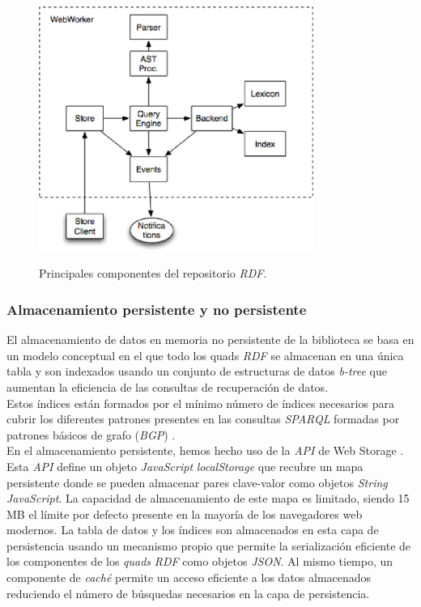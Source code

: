 \begin{figure}
\vspace{2.4in}
\centering
\caption{Principales componentes del repositorio \textit{RDF}.}
\vspace{5mm}
\includegraphics[width=0.8\textwidth]{figura4}
\label{figura4}
\end{figure}


\subsubsection{Almacenamiento persistente y no persistente}

El almacenamiento de datos en memoria no persistente de la biblioteca se basa en un modelo conceptual en el que todo los quads \textit{RDF} se almacenan en una \'unica tabla y son indexados usando un conjunto de estructuras de datos \textit{b-tree} que aumentan la eficiencia de las consultas de recuperaci\'on de datos.\\
Estos \'indices est\'an formados por el m\'inimo n\'umero de \'indices necesarios para cubrir los diferentes patrones presentes en las consultas \textit{SPARQL} formadas por patrones b\'asicos de grafo (\textit{BGP}) \cite{yars}.\\
En el almacenamiento persistente, hemos hecho uso de la \textit{API} de Web Storage \cite{webstorage}. Esta \textit{API} define un objeto \textit{JavaScript} \textit{localStorage} que recubre un mapa persistente donde se pueden almacenar pares clave-valor como objetos \textit{String} \textit{JavaScript}. La capacidad de almacenamiento de este mapa es limitado, siendo 15 MB el l\'imite por defecto presente en la mayor\'ia de los navegadores web modernos. La tabla de datos y los \'indices son almacenados en esta capa de persistencia usando un mecanismo propio que permite la serializaci\'on eficiente de los componentes de los \textit{quads} \textit{RDF} como objetos \textit{JSON}. Al mismo tiempo, un componente de \textit{cach\'e} permite un acceso eficiente a los datos almacenados reduciendo el n\'umero de b\'usquedas necesarios en la capa de persistencia.

